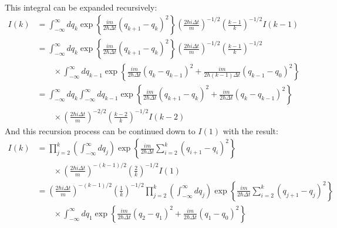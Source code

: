 \documentclass[12pt,a4]{article}
\begin{document}
\begin{enumerate}
\begin{align*}
    \end{align*}
    This integral can be expanded recursively:
    \begin{align*}
      I(k) &= \int_{-\infty}^\infty dq_k \exp\left\{\frac{im}{2\hbar \Delta t}\left(q_{k+1} - q_{k}\right)^2\right\} \left(\frac{2 \hbar i \Delta t}{m}\right)^{-1/2}\left( \frac{k - 1}{k}\right)^{-1/2}I(k-1) \\
           &= \int_{-\infty}^\infty dq_k \exp\left\{\frac{im}{2\hbar \Delta t}\left(q_{k+1} - q_{k}\right)^2\right\}\left(\frac{2 \hbar i \Delta t}{m}\right)^{-1/2}\left( \frac{k - 1}{k}\right)^{-1/2}\\
           &\qquad\times \int_{-\infty}^\infty dq_{k-1}\exp\left\{\frac{im}{2\hbar \Delta t}\left(q_{k} - q_{k-1}\right)^2 + \frac{im}{2\hbar (k-1)\Delta t}\left(q_{k-1} - q_{0}\right)^2\right\}\\
           &= \int_{-\infty}^\infty dq_k \int_{-\infty}^\infty dq_{k-1}\exp\left\{\frac{im}{2\hbar \Delta t}\left(q_{k+1} - q_{k}\right)^2 + \frac{im}{2\hbar \Delta t}\left(q_{k} - q_{k-1}\right)^2\right\}\\
           &\qquad \times \left(\frac{2 \hbar i \Delta t}{m}\right)^{-2/2}\left( \frac{k - 2}{k}\right)^{-1/2} I(k - 2)
    \end{align*}
    And this recursion process can be continued down to $I(1)$ with the result:
    \begin{align}
      I(k) &= \prod_{j = 2}^{k}\left(\int_{-\infty}^\infty dq_j\right) \exp\left\{\frac{im}{2\hbar \Delta t}\sum_{i = 2}^{k}\left(q_{i+1} - q_{i}\right)^2 \right\} \nonumber\\
           &\qquad \times \left(\frac{2 \hbar i \Delta t}{m}\right)^{-(k - 1)/2}\left( \frac{2}{k}\right)^{-1/2} I(1) \nonumber \\
           &= \left(\frac{2 \hbar i \Delta t}{m}\right)^{-(k - 1)/2}\left(\frac{1}{k}\right)^{-1/2} \prod_{j = 2}^{k}\left(\int_{-\infty}^\infty dq_j\right) \exp\left\{\frac{im}{2\hbar \Delta t}\sum_{i = 2}^{k}\left(q_{j+1} - q_{j}\right)^2 \right\} \nonumber\\
           &\qquad \times \int_{-\infty}^\infty dq_1 \exp\left\{\frac{im}{2\hbar \Delta t}\left(q_{2} - q_{1}\right)^2 + \frac{im}{2\hbar \Delta t}\left(q_{1} - q_{0}\right)^2\right\} \nonumber\\

\end{align}
\end{enumerate}
\end{document}
